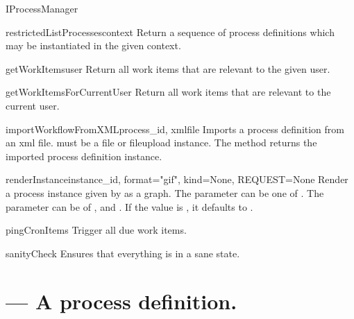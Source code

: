 \begin{classdesc}{IProcessManager}{}
    \begin{funcdesc}{restrictedListProcesses}{context}
        Return a sequence of process definitions which may be instantiated in
        the given context.
    \end{funcdesc}

    \begin{funcdesc}{getWorkItems}{user}
        Return all work items that are relevant to the given user.
    \end{funcdesc}

    \begin{funcdesc}{getWorkItemsForCurrentUser}{}
        Return all work items that are relevant to the current user.
    \end{funcdesc}

    \begin{funcdesc}{importWorkflowFromXML}{process_id, xmlfile}
        Imports a process definition from an xml file.  
        must be a file or fileupload instance. The method returns the 
        imported process definition instance.
    \end{funcdesc}
    
    \begin{funcdesc}{renderInstance}{instance_id, format="gif", kind=None, REQUEST=None}
        Render a process instance given by  as a 
        graph. The  parameter can be one of . The  parameter can be of , 
         and . If the value is , it 
        defaults to .
    \end{funcdesc}

    \begin{funcdesc}{pingCronItems}{}
        Trigger all due  work items.
    \end{funcdesc}

    \begin{funcdesc}{sanityCheck}{}
        Ensures that everything is in a sane state.
    \end{funcdesc}
    
  \end{classdesc}

  \section{ --- A process definition.}

